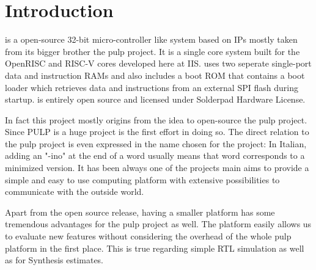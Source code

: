 
\chapter{Introduction}
\pulpino is a open-source 32-bit micro-controller like system based on IPs mostly taken from its bigger brother the \gls{pulp} project. It is a single core system built for the OpenRISC and RISC-V cores developed here at IIS. \pulpino uses two seperate single-port data and instruction RAMs and also includes a boot ROM that contains a boot loader which retrieves data and instructions from an external SPI flash during startup. \pulpino is entirely open source and licensed under Solderpad Hardware License.

In fact this project mostly origins from the idea to open-source the \gls{pulp} project. Since PULP is a huge project \pulpino is the first effort in doing so. The direct relation to the \gls{pulp} project is even expressed in the name chosen for the project: In Italian, adding an "-ino" at the end of a word usually means that word corresponds to a minimized version. It has been always one of the projects main aims to provide a simple and easy to use computing platform with extensive possibilities to communicate with the outside world.

Apart from the open source release, having a smaller platform has some tremendous advantages for the \gls{pulp} project as well. The \pulpino platform easily allows us to evaluate new features without considering the overhead of the whole \gls{pulp}
platform in the first place. This is true regarding simple RTL simulation as well as for Synthesis estimates.

